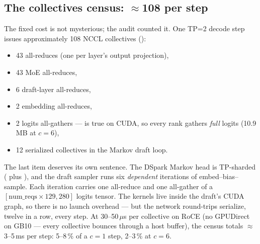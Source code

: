 \subsection{The collectives census: $\approx$108 per step}

The fixed cost is not mysterious; the audit counted it. One TP=2 decode step
issues approximately 108 NCCL collectives ():

\begin{itemize}
  \item 43  all-reduces (one per layer's output projection),
  \item 43 MoE all-reduces,
  \item 6 draft-layer all-reduces,
  \item 2 embedding all-reduces,
  \item 2 logits all-gathers ---  is true on CUDA, so
    every rank gathers \emph{full} logits (10.9\,MB at $c=6$),
  \item 12 serialized collectives in the Markov draft loop.
\end{itemize}

\begin{sloppypar}
The last item deserves its own sentence. The DSpark Markov head is TP-sharded
( plus ), and the draft
sampler runs six \emph{dependent} iterations of embed--bias--sample. Each
iteration carries one all-reduce and one all-gather of a
$[\text{num\_reqs} \times 129{,}280]$ logits tensor. The kernels live inside the
draft's CUDA graph, so there is no launch overhead --- but the network
round-trips serialize, twelve in a row, every step. At 30--50\,$\mu$s
per collective on RoCE (no GPUDirect on GB10 --- every collective bounces
through a host buffer), the census totals $\approx$3--5\,ms per step: 5--8\,\%
of a $c=1$ step, 2--3\,\% at $c=6$.
\end{sloppypar}

